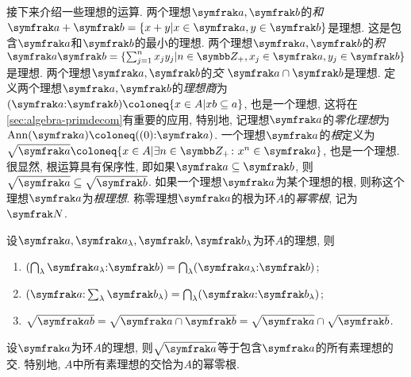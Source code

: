 接下来介绍一些理想的运算. 两个理想$\ideal{a}, \ideal{b}$的\emph{和} $\ideal{a}+\ideal{b}=\{x+y\vert x\in\ideal{a}, y\in\ideal{b}\}$是理想. 这是包含$\ideal{a}$和$\ideal{b}$的最小的理想. 两个理想$\ideal{a}, \ideal{b}$的\emph{积} $\ideal{a}\ideal{b}=\{\sum_{j=1}^n x_jy_j\vert n\in\ZZ_+, x_j\in\ideal{a}, y_j\in\ideal{b}\}$是理想. 两个理想$\ideal{a}, \ideal{b}$的\emph{交} $\ideal{a}\cap\ideal{b}$是理想. 定义两个理想$\ideal{a}, \ideal{b}$的\emph{理想商}为$(\ideal{a}{:}\ideal{b})\coloneq \{x\in A\vert xb\subseteq a\}$, 也是一个理想, 这将在\ref{sec:algebra-primdecom}有重要的应用, 特别地, 记理想$\ideal{a}$的\emph{零化理想}为$\Ann(\ideal{a})\coloneq ((0){:}\ideal{a})$. 一个理想$\ideal{a}$的\emph{根}定义为$\sqrt{\ideal{a}}\coloneq \{x\in A\vert \exists n\in\ZZ_+\colon x^n\in\ideal{a}\}$, 也是一个理想. 很显然, 根运算具有保序性, 即如果$\ideal{a}\subseteq\ideal{b}$, 则$\sqrt{\ideal{a}}\subseteq\sqrt{\ideal{b}}$. 如果一个理想$\ideal{a}$为某个理想的根, 则称这个理想$\ideal{a}$为\emph{根理想}. 称零理想$\ideal{a}$的根为环$A$的\emph{幂零根}, 记为$\nil$.

\begin{proposition}\label{prop:idealop}
  设$\ideal{a}, \ideal{a}_\lambda, \ideal{b}, \ideal{b}_\lambda$为环$A$的理想, 则
  \begin{enumerate}
    \item\label{enum:prop-idealop-quot-firstcap} $(\bigcap_\lambda \ideal{a}_\lambda{:}\ideal{b})=\bigcap_{\lambda}(\ideal{a}_\lambda{:}\ideal{b})$;
    \item $(\ideal{a}{:}\sum_{\lambda}\ideal{b}_\lambda)=\bigcap_{\lambda}(\ideal{a}{:}\ideal{b}_\lambda)$;
    \item\label{enum:prop-idealop-rad-inters} $\sqrt{\ideal{ab}}=\sqrt{\ideal{a}\cap\ideal{b}}=\sqrt{\ideal{a}}\cap\sqrt{\ideal{b}}$.
  \end{enumerate}
\end{proposition}

\begin{proposition}\label{prop:scheinnullstellensatz}
  设$\ideal{a}$为环$A$的理想, 则$\sqrt{\ideal{a}}$等于包含$\ideal{a}$的所有素理想的交. 特别地, $A$中所有素理想的交恰为$A$的幂零根.
\end{proposition}

